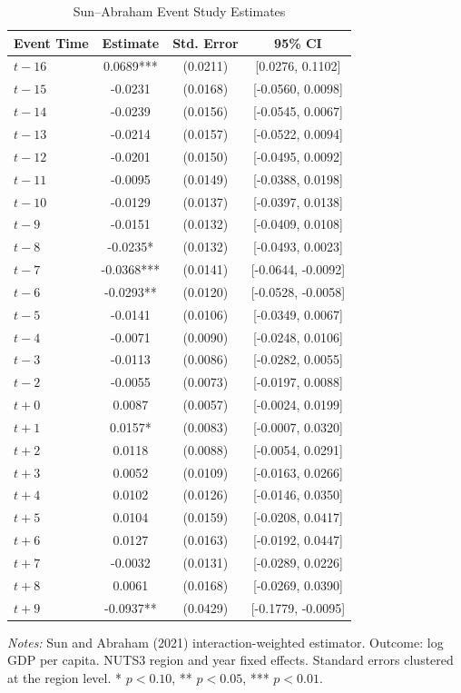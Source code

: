 \begin{table}[htbp]
\centering
\caption{Sun--Abraham Event Study Estimates}
\label{tab:event_study}
\begin{tabular}{lccc}
\toprule
Event Time & Estimate & Std. Error & 95\% CI \\
\midrule
$t-16$ & 0.0689*** & (0.0211) & [0.0276, 0.1102] \\
$t-15$ & -0.0231 & (0.0168) & [-0.0560, 0.0098] \\
$t-14$ & -0.0239 & (0.0156) & [-0.0545, 0.0067] \\
$t-13$ & -0.0214 & (0.0157) & [-0.0522, 0.0094] \\
$t-12$ & -0.0201 & (0.0150) & [-0.0495, 0.0092] \\
$t-11$ & -0.0095 & (0.0149) & [-0.0388, 0.0198] \\
$t-10$ & -0.0129 & (0.0137) & [-0.0397, 0.0138] \\
$t-9$ & -0.0151 & (0.0132) & [-0.0409, 0.0108] \\
$t-8$ & -0.0235* & (0.0132) & [-0.0493, 0.0023] \\
$t-7$ & -0.0368*** & (0.0141) & [-0.0644, -0.0092] \\
$t-6$ & -0.0293** & (0.0120) & [-0.0528, -0.0058] \\
$t-5$ & -0.0141 & (0.0106) & [-0.0349, 0.0067] \\
$t-4$ & -0.0071 & (0.0090) & [-0.0248, 0.0106] \\
$t-3$ & -0.0113 & (0.0086) & [-0.0282, 0.0055] \\
$t-2$ & -0.0055 & (0.0073) & [-0.0197, 0.0088] \\
$t+0$ & 0.0087 & (0.0057) & [-0.0024, 0.0199] \\
$t+1$ & 0.0157* & (0.0083) & [-0.0007, 0.0320] \\
$t+2$ & 0.0118 & (0.0088) & [-0.0054, 0.0291] \\
$t+3$ & 0.0052 & (0.0109) & [-0.0163, 0.0266] \\
$t+4$ & 0.0102 & (0.0126) & [-0.0146, 0.0350] \\
$t+5$ & 0.0104 & (0.0159) & [-0.0208, 0.0417] \\
$t+6$ & 0.0127 & (0.0163) & [-0.0192, 0.0447] \\
$t+7$ & -0.0032 & (0.0131) & [-0.0289, 0.0226] \\
$t+8$ & 0.0061 & (0.0168) & [-0.0269, 0.0390] \\
$t+9$ & -0.0937** & (0.0429) & [-0.1779, -0.0095] \\
\bottomrule
\end{tabular}
\begin{tablenotes}[flushleft]
\small
\item \textit{Notes:} Sun and Abraham (2021) interaction-weighted estimator.
Outcome: log GDP per capita. NUTS3 region and year fixed effects.
Standard errors clustered at the region level.
* $p<0.10$, ** $p<0.05$, *** $p<0.01$.
\end{tablenotes}
\end{table}
